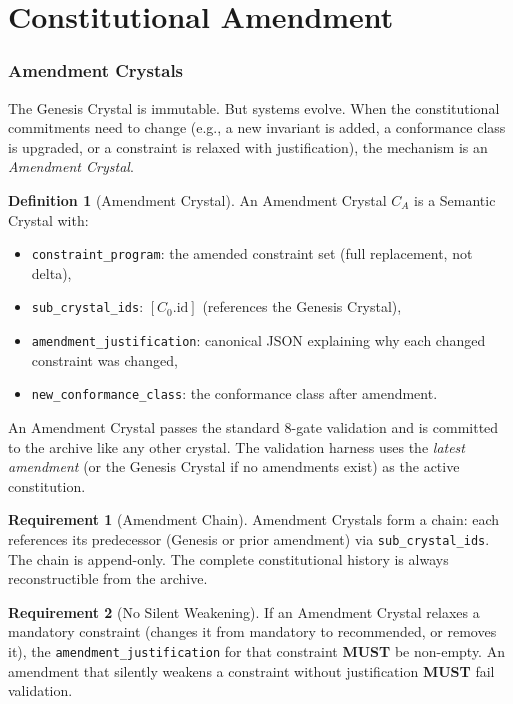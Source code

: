 \documentclass[11pt,a4paper,twoside]{article}
\theoremstyle{definition}
\newtheorem{definition}{Definition}[section]
\newtheorem{requirement}{Requirement}[section]
\theoremstyle{plain}
\theoremstyle{remark}
\begin{document}
\part{Constitutional Amendment}\label{part:amendment}

\section{Amendment Crystals}\label{sec:amendment}

The Genesis Crystal is immutable. But systems evolve. When the
constitutional commitments need to change (e.g., a new invariant is
added, a conformance class is upgraded, or a constraint is relaxed
with justification), the mechanism is an \emph{Amendment Crystal}.

\begin{definition}[Amendment Crystal]\label{def:amendment}
An Amendment Crystal $C_A$ is a Semantic Crystal with:
\begin{itemize}[nosep]
  \item \texttt{constraint\_program}: the amended constraint set
        (full replacement, not delta),
  \item \texttt{sub\_crystal\_ids}: $[C_0.\mathrm{id}]$ (references
        the Genesis Crystal),
  \item \texttt{amendment\_justification}: canonical JSON explaining
        why each changed constraint was changed,
  \item \texttt{new\_conformance\_class}: the conformance class after
        amendment.
\end{itemize}
An Amendment Crystal passes the standard 8-gate validation and is
committed to the archive like any other crystal. The validation
harness uses the \emph{latest amendment} (or the Genesis Crystal if
no amendments exist) as the active constitution.
\end{definition}

\begin{requirement}[Amendment Chain]\label{req:amendchain}
Amendment Crystals form a chain: each references its predecessor
(Genesis or prior amendment) via \texttt{sub\_crystal\_ids}. The
chain is append-only. The complete constitutional history is
always reconstructible from the archive.
\end{requirement}

\begin{requirement}[No Silent Weakening]\label{req:noweaken}
If an Amendment Crystal relaxes a mandatory constraint (changes it
from mandatory to recommended, or removes it), the
\texttt{amendment\_justification} for that constraint \textbf{MUST}
be non-empty. An amendment that silently weakens a constraint without
justification \textbf{MUST} fail validation.
\end{requirement}
\end{document}
